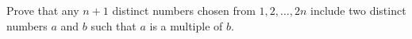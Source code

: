 Prove that any $n+1$ distinct numbers chosen from $1,2,\dots,2n$ include two distinct numbers $a$ and $b$ such that $a$ is a multiple of $b$.
